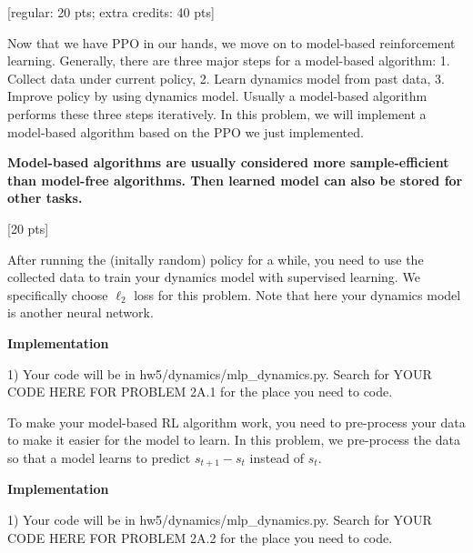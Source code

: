 \documentclass{article}
\begin{document}
\vskip 0.5in
 [regular: 20 pts; extra credits: 40 pts]

Now that we have PPO in our hands, we move on to model-based reinforcement learning. Generally, there are three major steps for a model-based algorithm: 1. Collect data under current policy, 2. Learn dynamics model from past data, 3. Improve policy by using dynamics model. Usually a model-based algorithm performs these three steps iteratively. In this problem, we will implement a model-based algorithm based on the PPO we just implemented.

{\bf Model-based algorithms are usually considered more sample-efficient than model-free algorithms. Then learned model can also be stored for other tasks.}

\vskip 0.5in
 [20 pts]

  After running the (initally random) policy for a while, you need to use the collected data to train your dynamics model with supervised learning. We specifically choose $\ell_2$ loss for this problem. Note that here your dynamics model is another neural network. 

{\bf Implementation} 
 
 1) Your code will be in hw5/dynamics/mlp\_dynamics.py. Search for YOUR CODE HERE FOR PROBLEM 2A.1 for the place you need to code.
 
 \vskip 0.5in
 
To make your model-based RL algorithm work, you need to pre-process your data to make it easier for the model to learn. In this problem, we pre-process the data so that a model learns to predict $s_{t+1}-s_t$ instead of $s_t$.  

{\bf Implementation} 
 
 1) Your code will be in hw5/dynamics/mlp\_dynamics.py. Search for YOUR CODE HERE FOR PROBLEM 2A.2 for the place you need to code.
\end{document}
